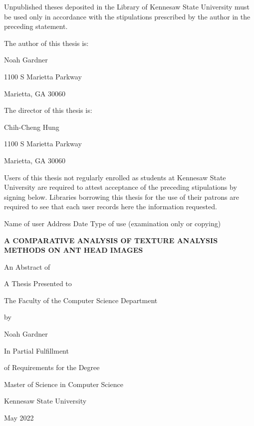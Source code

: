 \documentclass[12pt]{article}
\newcommand{\thesistitle}{
    {\Large A comparative analysis of texture analysis methods on
ant head images}
}
\newcommand{\toppage}{\vspace*{0.3in}}
\begin{document}
\noindent Unpublished theses deposited in the Library of Kennesaw State
University must be used only in accordance with the stipulations prescribed by
the author in the preceding statement.
\vspace{0.5in}

\noindent The author of this thesis is:
\begin{center}
    Noah Gardner

    1100 S Marietta Parkway

    Marietta, GA 30060
\end{center}

\noindent The director of this thesis is:
\begin{center}
    Chih-Cheng Hung

    1100 S Marietta Parkway

    Marietta, GA 30060
\end{center}
\vspace{0.5in}

\noindent Users of this thesis not regularly enrolled as students at Kennesaw
State University are required to attest acceptance of the preceding stipulations
by signing below. Libraries borrowing this thesis for the use of their patrons
are required to see that each user records here the information requested.
\vspace{0.3in}

\noindent
Name of user \hspace{0.2in} Address \hspace{0.2in} Date \hspace{0.2in} Type of
use (examination only or copying)
\newpage

\toppage
\begin{center}
    \textbf{\MakeUppercase{\thesistitle}}
    \vspace{1in}

    An Abstract of

    A Thesis Presented to

    The Faculty of the Computer Science Department
    \vspace{1in}

    by
    \vspace{0.5in}

    Noah Gardner
    \vspace{1in}

    In Partial Fulfillment

    of Requirements for the Degree

    Master of Science in Computer Science

    \vspace{1in}
    Kennesaw State University

    May 2022
\end{center}
\newpage
\end{document}
